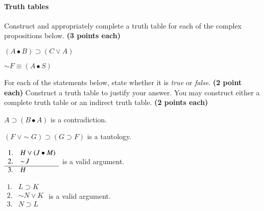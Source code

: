 \documentclass[10pt]{article}
\begin{document}
\begin{enumerate}
\paragraph{Truth tables}

Construct and appropriately complete a truth table for each of the complex propositions below. \textbf{(3 points each)}

  \begin{multicols}{2}
  \item $(A \bullet B) \supset (C \vee A)$
  
  \item $\sim\! F \equiv (A \bullet S)$
  
  \end{multicols}
  \vspace{4cm}
  

\newpage

For each of the statements below, state whether it is \textit{true} or \textit{false}. \textbf{(2 point each)} Construct a truth table to justify your answer.  You may construct either a complete truth table or an indirect truth table. \textbf{(2 points each)}

  \begin{multicols}{2}
  \item $A \supset (B \bullet A)$ is a contradiction.
  
  \item $(F\; \vee \sim\! G) \supset (G \supset F)$ is a tautology.
  \end{multicols}
  \vspace{4cm}
  
  \begin{multicols}{2}
  \item $\begin{array}{ll}
         1. & H \vee (J \bullet M) \\
         2. & \sim\! J \\ \cline{1-2}
         3. & H \\
        \end{array}$ is a valid argument.
  
  \item $\begin{array}{ll}
         1. & L \supset K \\
         2. & \sim\! N \vee K \\ \hline
         3. & N \supset L \\
        \end{array}$ is a valid argument.
  

\end{multicols}
\end{enumerate}
\end{document}
